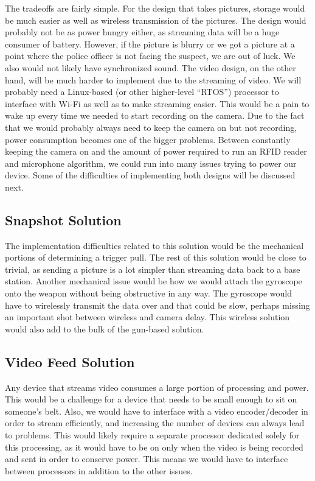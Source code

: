 \documentclass[12pt]{article}
\begin{document}
The tradeoffs are fairly simple. For the design that takes pictures, storage
would be much easier as well as wireless transmission of the pictures. The
design would probably not be as power hungry either, as streaming data will be
a huge consumer of battery. However, if the picture is blurry or we got a
picture at a point where the police officer is not facing the suspect, we are
out of luck. We also would not likely have synchronized sound. The video
design, on the other hand, will be much harder to implement due to the
streaming of video. We will probably need a Linux-based (or other higher-level
“RTOS”) processor to interface with Wi-Fi as well as to make streaming easier.
This would be a pain to wake up every time we needed to start recording on the
camera. Due to the fact that we would probably always need to keep the camera
on but not recording, power consumption becomes one of the bigger problems.
Between constantly keeping the camera on and the amount of power required to
run an RFID reader and microphone algorithm, we could run into many issues
trying to power our device. Some of the difficulties of implementing both
designs will be discussed next.

\subsection{Snapshot Solution}

The implementation difficulties related to this solution would be the
mechanical portions of determining a trigger pull. The rest of this solution
would be close to trivial, as sending a picture is a lot simpler than streaming
data back to a base station. Another mechanical issue would be how we would
attach the gyroscope onto the weapon without being obstructive in any way. The
gyroscope would have to wirelessly transmit the data over and that could be
slow, perhaps missing an important shot between wireless and camera delay. This
wireless solution would also add to the bulk of the gun-based solution.

\subsection{Video Feed Solution}

Any device that streams video consumes a large portion of processing and power.
This would be a challenge for a device that needs to be small enough to sit on
someone’s belt. Also, we would have to interface with a video encoder/decoder
in order to stream efficiently, and increasing the number of devices can always
lead to problems. This would likely require a separate processor dedicated
solely for this processing, as it would have to be on only when the video is
being recorded and sent in order to conserve power. This means we would have to
interface between processors in addition to the other issues.
\end{document}
